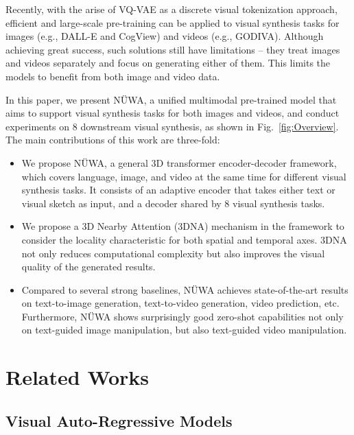 Recently, with the arise of VQ-VAE\cite{oordNeuralDiscreteRepresentation2017} as a discrete visual tokenization approach, efficient and large-scale pre-training can be applied to visual synthesis tasks for images (e.g., DALL-E\cite{rameshZeroShotTexttoImageGeneration2021} and CogView\cite{dingCogViewMasteringTexttoImage2021}) and videos (e.g., GODIVA\cite{wuGODIVAGeneratingOpenDomaIn2021}). Although achieving great success, such solutions still have limitations -- they treat images and videos separately and focus on generating either of them. This limits the models to benefit from both image and video data.

In this paper, we present NÜWA, a unified multimodal pre-trained model that aims to support visual synthesis tasks for both images and videos, and conduct experiments on 8 downstream visual synthesis, as shown in Fig.~\ref{fig:Overview}.
The main contributions of this work are three-fold:

\begin{itemize}
    \item We propose NÜWA, a general 3D transformer encoder-decoder framework, which covers language, image, and video at the same time for different visual synthesis tasks. It consists of an adaptive encoder that takes either text or visual sketch as input, and a decoder shared by 8 visual synthesis tasks.
    \item We propose a 3D Nearby Attention (3DNA) mechanism in the framework to consider the locality characteristic for both spatial and temporal axes. 3DNA not only reduces computational complexity but also improves the visual quality of the generated results.

    \item Compared to several strong baselines, NÜWA achieves state-of-the-art results on text-to-image generation, text-to-video generation, video prediction, etc. Furthermore, NÜWA shows surprisingly good zero-shot capabilities not only on text-guided image manipulation, but also text-guided video manipulation.

\end{itemize}

\section{Related Works}\label{sec:rw}

\subsection{Visual Auto-Regressive Models}

